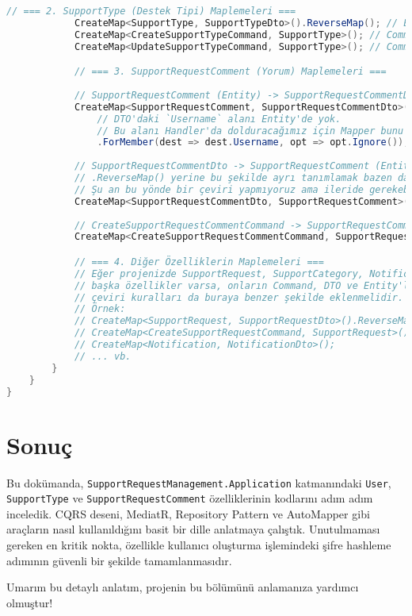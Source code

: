 \documentclass[11pt, a4paper]{article}
\begin{document}
\begin{lstlisting}[language=C#]
            // === 2. SupportType (Destek Tipi) Maplemeleri ===
            CreateMap<SupportType, SupportTypeDto>().ReverseMap(); // Entity <-> DTO
            CreateMap<CreateSupportTypeCommand, SupportType>(); // Command -> Entity
            CreateMap<UpdateSupportTypeCommand, SupportType>(); // Command -> Entity

            // === 3. SupportRequestComment (Yorum) Maplemeleri ===
            
            // SupportRequestComment (Entity) -> SupportRequestCommentDto
            CreateMap<SupportRequestComment, SupportRequestCommentDto>()
                // DTO'daki `Username` alanı Entity'de yok.
                // Bu alanı Handler'da dolduracağımız için Mapper bunu ignore etsin.
                .ForMember(dest => dest.Username, opt => opt.Ignore()); 
            
            // SupportRequestCommentDto -> SupportRequestComment (Entity)
            // .ReverseMap() yerine bu şekilde ayrı tanımlamak bazen daha nettir.
            // Şu an bu yönde bir çeviri yapmıyoruz ama ileride gerekebilir.
            CreateMap<SupportRequestCommentDto, SupportRequestComment>(); 
                
            // CreateSupportRequestCommentCommand -> SupportRequestComment (Entity)
            CreateMap<CreateSupportRequestCommentCommand, SupportRequestComment>();

            // === 4. Diğer Özelliklerin Maplemeleri ===
            // Eğer projenizde SupportRequest, SupportCategory, Notification gibi 
            // başka özellikler varsa, onların Command, DTO ve Entity'leri arasındaki
            // çeviri kuralları da buraya benzer şekilde eklenmelidir.
            // Örnek:
            // CreateMap<SupportRequest, SupportRequestDto>().ReverseMap();
            // CreateMap<CreateSupportRequestCommand, SupportRequest>();
            // CreateMap<Notification, NotificationDto>();
            // ... vb.
        }
    }
}
\end{lstlisting}

\section{Sonuç}

Bu dokümanda, \texttt{SupportRequestManagement.Application} katmanındaki \texttt{User}, \texttt{SupportType} ve \texttt{SupportRequestComment} özelliklerinin kodlarını adım adım inceledik. CQRS deseni, MediatR, Repository Pattern ve AutoMapper gibi araçların nasıl kullanıldığını basit bir dille anlatmaya çalıştık. Unutulmaması gereken en kritik nokta, özellikle kullanıcı oluşturma işlemindeki şifre hashleme adımının güvenli bir şekilde tamamlanmasıdır.

Umarım bu detaylı anlatım, projenin bu bölümünü anlamanıza yardımcı olmuştur!
\end{document}
